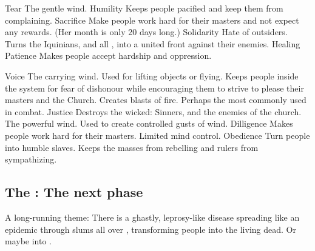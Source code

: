 \begin{comment}
\subsubsection{Tear}
\end{comment}
\begin{sephirahlist}{Tear}
\sephitem
  {\Feazirah}
  {\female}
  {The gentle wind.}
  {Humility}
  {Keeps people pacified and keep them from complaining.}
\sephitem
  {\Gamishiel}
  {\female}
  {}
  {Sacrifice}
  {Make people work hard for their masters and not expect any rewards. (Her month is only 20 days long.)}
\sephitem
  {\Hapheron}
  {\male}
  {}
  {Solidarity}
  {Hate of outsiders. Turns the Iquinians, and all \humans, into a united front against their enemies.}
\sephitem
  {\Ishiel}
  {\female}
  {Healing}
  {Patience}
  {Makes people accept hardship and oppression.}
\end{sephirahlist}





\begin{comment}
\subsubsection{Voice}
\end{comment}
\begin{sephirahlist}{Voice}
\sephitem
  {\Atzirah}
  {\male}
  {The carrying wind. Used for lifting objects or flying.}
  {\Honour}
  {Keeps people inside the system for fear of dishonour while encouraging them to strive to please their masters and the Church.}
\sephitem
  {\Izion}
  {\male}
  {Creates blasts of fire. Perhaps the \Sephirah{} most commonly used in combat. }
  {Justice}
  {Destroys the wicked: Sinners, and the enemies of the church.}
\sephitem
  {\Keshirah}
  {\female}
  {The powerful wind. Used to create controlled gusts of wind. }
  {Dilligence}
  {Makes people work hard for their masters.}
\sephitem
  {\Thimared}
  {\female}
  {Limited mind control.}
  {Obedience}
  {Turn people into humble slaves. Keeps the masses from rebelling and rulers from sympathizing.}
\end{sephirahlist}







\subsection{The \Morbus: The next phase}
A long-running theme: 
There is a ghastly, leprosy-like disease spreading like an epidemic through slums all over \Azmith, transforming people into the living dead. Or maybe into . 

